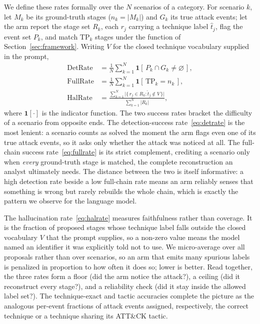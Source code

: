 \documentclass[journal]{IEEEtran}
\begin{document}
We define these rates formally over the $N$ scenarios of a category. For scenario $k$, let $M_k$ be its
ground-truth stages ($n_k=|M_k|$) and $G_k$ its true attack events; let the arm report the stage set
$R_k$, each $r_j$ carrying a technique label $\hat t_j$, flag the event set $P_k$, and match
$\mathrm{TP}_k$ stages under the function of Section~\ref{sec:framework}. Writing $V$ for the closed
technique vocabulary supplied in the prompt,
\begin{align}
\mathrm{DetRate}  &= \frac{1}{N}\sum_{k=1}^{N}\mathbf{1}\!\left[\,P_k\cap G_k\neq\varnothing\,\right],
  \label{eq:detrate}\\[2pt]
\mathrm{FullRate} &= \frac{1}{N}\sum_{k=1}^{N}\mathbf{1}\!\left[\,\mathrm{TP}_k=n_k\,\right],
  \label{eq:fullrate}\\[2pt]
\mathrm{HalRate}  &= \frac{\sum_{k=1}^{N}\bigl|\{\,r_j\in R_k:\hat t_j\notin V\,\}\bigr|}
  {\sum_{k=1}^{N}\lvert R_k\rvert},
  \label{eq:halrate}
\end{align}
where $\mathbf{1}[\cdot]$ is the indicator function. The two success rates bracket the difficulty of a
scenario from opposite ends. The detection-success rate~\eqref{eq:detrate} is the most lenient: a
scenario counts as solved the moment the arm flags even one of its true attack events, so it asks only
whether the attack was noticed at all. The full-chain success rate~\eqref{eq:fullrate} is its strict
complement, crediting a scenario only when \emph{every} ground-truth stage is matched, the complete
reconstruction an analyst ultimately needs. The distance between the two is itself informative: a high
detection rate beside a low full-chain rate means an arm reliably senses that something is wrong but
rarely rebuilds the whole chain, which is exactly the pattern we observe for the language model.

The hallucination rate~\eqref{eq:halrate} measures faithfulness rather than coverage. It is the fraction
of proposed stages whose technique label falls outside the closed vocabulary $V$ that the prompt
supplies, so a non-zero value means the model named an identifier it was explicitly told not to use. We
micro-average over all proposals rather than over scenarios, so an arm that emits many spurious labels is
penalized in proportion to how often it does so; lower is better. Read together, the three rates form a
floor (did the arm notice the attack?), a ceiling (did it reconstruct every stage?), and a reliability
check (did it stay inside the allowed label set?). The technique-exact and tactic accuracies complete the
picture as the analogous per-event fractions of attack events assigned, respectively, the correct
technique or a technique sharing its ATT\&CK tactic.
\end{document}
